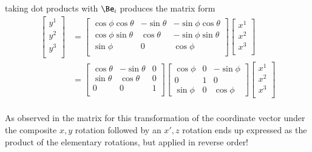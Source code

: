 taking dot products with $\Be_i$ produces the matrix form
\begin{align*}
\begin{bmatrix}
y^1 \\
y^2 \\
y^3 \\
\end{bmatrix}
&=
\begin{bmatrix}
\cos\phi \cos\theta & - \sin\theta & - \sin\phi \cos\theta \\
\cos\phi \sin\theta & \cos\theta & - \sin\phi \sin\theta \\
\sin\phi & 0 & \cos\phi \\
\end{bmatrix}
\begin{bmatrix}
x^1 \\
x^2 \\
x^3 \\
\end{bmatrix} \\
&=
\begin{bmatrix}
\cos\theta & -\sin\theta & 0 \\
\sin\theta & \cos\theta & 0 \\
0 & 0 & 1 \\
\end{bmatrix}
\begin{bmatrix}
\cos\phi & 0 & -\sin\phi \\
0 & 1 & 0 \\
\sin\phi & 0 & \cos\phi
\end{bmatrix}
\begin{bmatrix}
x^1 \\
x^2 \\
x^3 \\
\end{bmatrix} \\
\end{align*}

As observed in  the matrix for this transformation of the coordinate vector under the composite $x,y$ rotation followed by
an $x', z$ rotation ends up expressed as the product of the elementary rotations, but applied in reverse order!

